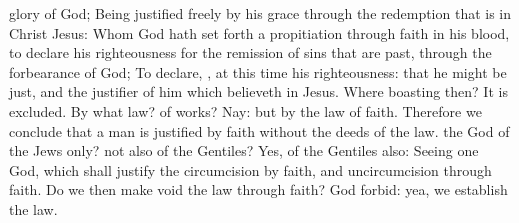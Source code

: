 {glory of
God;
Being
justified
freely
by
his
grace
through the
redemption that
is
in
Christ
Jesus:
Whom
God hath set
forth
{} a
propitiation
through
faith
in
his
blood,
to
declare
his
righteousness
for the
remission of
sins that are
past, through the forbearance of God;
To
declare,
{},
at
this
time
his
righteousness:
that
he might
be
just,
and the
justifier of him which
believeth in
Jesus.
Where
{}
boasting
then? It is
excluded.
By
what
law? of
works?
Nay:
but
by the
law of
faith.
Therefore we conclude
that a
man is
justified by
faith
without the
deeds of the
law.
 the
God of the
Jews
only?
{}
not
also of the
Gentiles?
Yes, of the
Gentiles
also:
Seeing
{}
one
God,
which shall
justify the
circumcision
by
faith,
and
uncircumcision
through
faith.
Do
we
then make
void the
law
through
faith? God
forbid:
yea, we
establish the
law.

}
